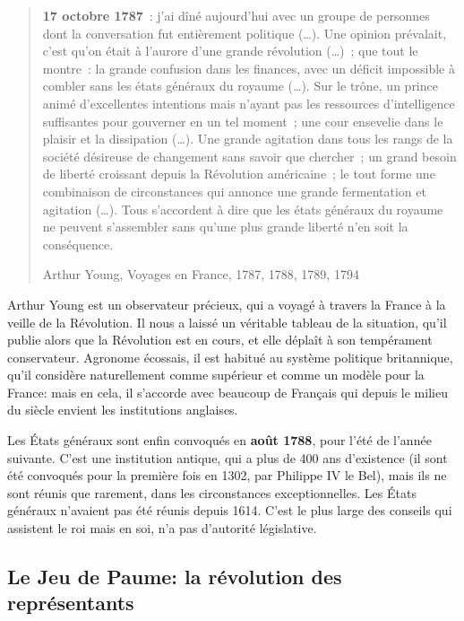 \documentclass[
  french,
  letterpaper,
  DIV=11,
  numbers=noendperiod]{scrartcl}
\begin{document}
\begin{quote}
\textbf{17 octobre 1787}~: j'ai dîné aujourd'hui avec un groupe de
personnes dont la conversation fut entièrement politique (\ldots). Une
opinion prévalait, c'est qu'on était à l'aurore d'une grande révolution
(\ldots)~; que tout le montre~: la grande confusion dans les finances,
avec un déficit impossible à combler sans les états généraux du royaume
(\ldots). Sur le trône, un prince animé d'excellentes intentions mais
n'ayant pas les ressources d'intelligence suffisantes pour gouverner en
un tel moment~; une cour ensevelie dans le plaisir et la dissipation
(\ldots). Une grande agitation dans tous les rangs de la société
désireuse de changement sans savoir que chercher~; un grand besoin de
liberté croissant depuis la Révolution américaine~; le tout forme une
combinaison de circonstances qui annonce une grande fermentation et
agitation (\ldots). Tous s'accordent à dire que les états généraux du
royaume ne peuvent s'assembler sans qu'une plus grande liberté n'en soit
la conséquence.

Arthur Young, Voyages en France, 1787, 1788, 1789, 1794
\end{quote}

Arthur Young est un observateur précieux, qui a voyagé à travers la
France à la veille de la Révolution. Il nous a laissé un véritable
tableau de la situation, qu'il publie alors que la Révolution est en
cours, et elle déplaît à son tempérament conservateur. Agronome
écossais, il est habitué au système politique britannique, qu'il
considère naturellement comme supérieur et comme un modèle pour la
France: mais en cela, il s'accorde avec beaucoup de Français qui depuis
le milieu du siècle envient les institutions anglaises.

Les États généraux sont enfin convoqués en \textbf{août 1788}, pour
l'été de l'année suivante. C'est une institution antique, qui a plus de
400 ans d'existence (il sont été convoqués pour la première fois en
1302, par Philippe IV le Bel), mais ils ne sont réunis que rarement,
dans les circonstances exceptionnelles. Les États généraux n'avaient pas
été réunis depuis 1614. C'est le plus large des conseils qui assistent
le roi mais en soi, n'a pas d'autorité législative.

\subsection{Le Jeu de Paume: la révolution des
représentants}\label{le-jeu-de-paume-la-ruxe9volution-des-repruxe9sentants}
\end{document}

